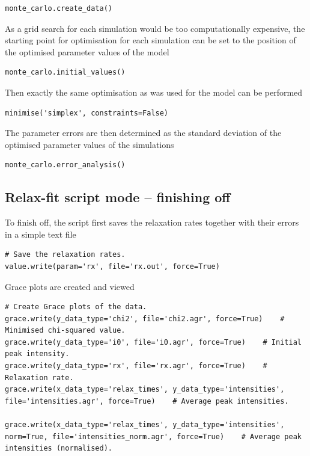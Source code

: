 \begin{lstlisting}[firstnumber=70]
monte_carlo.create_data()
\end{lstlisting}

As a grid search for each simulation would be too computationally expensive, the starting point for optimisation for each simulation can be set to the position of the optimised parameter values of the model

\begin{lstlisting}[firstnumber=71]
monte_carlo.initial_values()
\end{lstlisting}

Then exactly the same optimisation as was used for the model can be performed

\begin{lstlisting}[firstnumber=72]
minimise('simplex', constraints=False)
\end{lstlisting}

The parameter errors are then determined as the standard deviation of the optimised parameter values of the simulations

\begin{lstlisting}[firstnumber=73]
monte_carlo.error_analysis()
\end{lstlisting}



\subsection{Relax-fit script mode -- finishing off}

To finish off, the script first saves the relaxation rates together with their errors in a simple text file

\begin{lstlisting}[firstnumber=75]
# Save the relaxation rates.
value.write(param='rx', file='rx.out', force=True)
\end{lstlisting}

Grace plots are created and viewed

\begin{lstlisting}[firstnumber=81]
# Create Grace plots of the data.
grace.write(y_data_type='chi2', file='chi2.agr', force=True)    # Minimised chi-squared value.
grace.write(y_data_type='i0', file='i0.agr', force=True)    # Initial peak intensity.
grace.write(y_data_type='rx', file='rx.agr', force=True)    # Relaxation rate.
grace.write(x_data_type='relax_times', y_data_type='intensities', file='intensities.agr', force=True)    # Average peak intensities.

grace.write(x_data_type='relax_times', y_data_type='intensities', norm=True, file='intensities_norm.agr', force=True)    # Average peak intensities (normalised).
\end{lstlisting}

